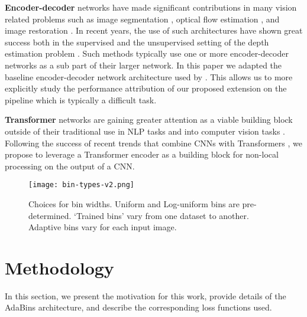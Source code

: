 \documentclass[final]{cvpr}
\begin{document}
\textbf{Encoder-decoder} networks have made significant contributions in many vision related problems such as image segmentation \cite{Ronneberger2015u}, optical flow estimation \cite{Dosovitskiy2015}, and image restoration \cite{LehtinenMHLKAA18}. In recent years, the use of such architectures have shown great success both in the supervised and the unsupervised setting of the depth estimation problem \cite{Godard2017,Ummenhofer2017,Huang2018DeepMVSLM,Zhou2018DeepTAMDT,Alhashim2018}. Such methods typically use one or more encoder-decoder networks as a sub part of their larger network. In this paper we adapted the baseline encoder-decoder network architecture used by \cite{Alhashim2018}. This allows us to more explicitly study the performance attribution of our proposed extension on the pipeline which is typically a difficult task.

\textbf{Transformer} networks are gaining greater attention as a viable building block outside of their traditional use in NLP tasks and into computer vision tasks \cite{pmlr-v80-parmar18a,Wang_2018_CVPR,detr2020,dosovitskiy2020}. Following the success of recent trends that combine CNNs with Transformers \cite{detr2020}, we propose to leverage a Transformer encoder as a building block for non-local processing on the output of a CNN.

\begin{figure}[t]
\centering
   \texttt{[image: bin-types-v2.png]}
   \caption{Choices for bin widths. Uniform and Log-uniform bins are pre-determined. `Trained bins' vary from one dataset to another. Adaptive bins vary for each input image.}
\label{fig:binchoices}
\end{figure}


\section{Methodology}

In this section, we present the motivation for this work, provide details of the AdaBins architecture, and describe the corresponding loss functions used.
\end{document}
